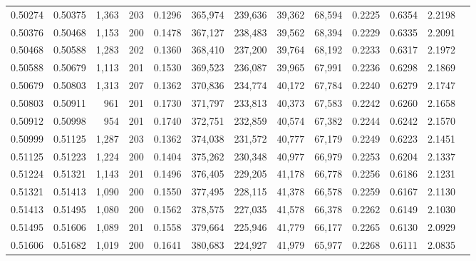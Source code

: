 \begin{tabular}{rrrrrrrrrrrrr}
0.50274 & 0.50375 & 1,363 & 203 &                                     0.1296 & 365,974 & 239,636 &  39,362 &  68,594 & 0.2225 & 0.6354 & 2.2198 \\
0.50376 & 0.50468 & 1,153 & 200 &                                     0.1478 & 367,127 & 238,483 &  39,562 &  68,394 & 0.2229 & 0.6335 & 2.2091 \\
0.50468 & 0.50588 & 1,283 & 202 &                                     0.1360 & 368,410 & 237,200 &  39,764 &  68,192 & 0.2233 & 0.6317 & 2.1972 \\
0.50588 & 0.50679 & 1,113 & 201 &                                     0.1530 & 369,523 & 236,087 &  39,965 &  67,991 & 0.2236 & 0.6298 & 2.1869 \\
0.50679 & 0.50803 & 1,313 & 207 &                                     0.1362 & 370,836 & 234,774 &  40,172 &  67,784 & 0.2240 & 0.6279 & 2.1747 \\
0.50803 & 0.50911 &   961 & 201 &                                     0.1730 & 371,797 & 233,813 &  40,373 &  67,583 & 0.2242 & 0.6260 & 2.1658 \\
0.50912 & 0.50998 &   954 & 201 &                                     0.1740 & 372,751 & 232,859 &  40,574 &  67,382 & 0.2244 & 0.6242 & 2.1570 \\
0.50999 & 0.51125 & 1,287 & 203 &                                     0.1362 & 374,038 & 231,572 &  40,777 &  67,179 & 0.2249 & 0.6223 & 2.1451 \\
0.51125 & 0.51223 & 1,224 & 200 &                                     0.1404 & 375,262 & 230,348 &  40,977 &  66,979 & 0.2253 & 0.6204 & 2.1337 \\
0.51224 & 0.51321 & 1,143 & 201 &                                     0.1496 & 376,405 & 229,205 &  41,178 &  66,778 & 0.2256 & 0.6186 & 2.1231 \\
0.51321 & 0.51413 & 1,090 & 200 &                                     0.1550 & 377,495 & 228,115 &  41,378 &  66,578 & 0.2259 & 0.6167 & 2.1130 \\
0.51413 & 0.51495 & 1,080 & 200 &                                     0.1562 & 378,575 & 227,035 &  41,578 &  66,378 & 0.2262 & 0.6149 & 2.1030 \\
0.51495 & 0.51606 & 1,089 & 201 &                                     0.1558 & 379,664 & 225,946 &  41,779 &  66,177 & 0.2265 & 0.6130 & 2.0929 \\
0.51606 & 0.51682 & 1,019 & 200 &                                     0.1641 & 380,683 & 224,927 &  41,979 &  65,977 & 0.2268 & 0.6111 & 2.0835 \\

\end{tabular}
